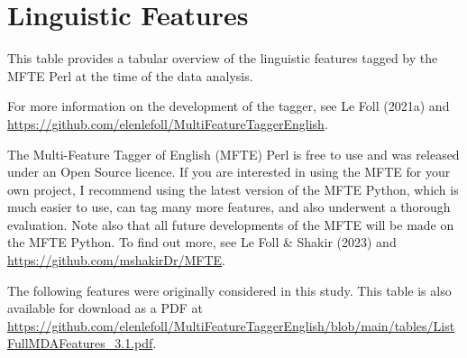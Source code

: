 \documentclass[
  letterpaper,
  DIV=11,
  numbers=noendperiod]{scrreprt}
\begin{document}
\chapter{Linguistic Features}\label{linguistic-features}

This table provides a tabular overview of the linguistic features tagged
by the MFTE Perl at the time of the data analysis.

For more information on the development of the tagger, see Le Foll
(2021a) and
\url{https://github.com/elenlefoll/MultiFeatureTaggerEnglish}.

\begin{tcolorbox}[enhanced jigsaw, colframe=quarto-callout-tip-color-frame, title=\textcolor{quarto-callout-tip-color}{\faLightbulb}\hspace{0.5em}{Using the MFTE}, toptitle=1mm, toprule=.15mm, opacityback=0, colbacktitle=quarto-callout-tip-color!10!white, bottomtitle=1mm, arc=.35mm, opacitybacktitle=0.6, colback=white, rightrule=.15mm, coltitle=black, left=2mm, titlerule=0mm, bottomrule=.15mm, leftrule=.75mm, breakable]

The Multi-Feature Tagger of English (MFTE) Perl is free to use and was
released under an Open Source licence. If you are interested in using
the MFTE for your own project, I recommend using the latest version of
the MFTE Python, which is much easier to use, can tag many more
features, and also underwent a thorough evaluation. Note also that all
future developments of the MFTE will be made on the MFTE Python. To find
out more, see Le Foll \& Shakir (2023) and
\url{https://github.com/mshakirDr/MFTE}.

\end{tcolorbox}

The following features were originally considered in this study. This
table is also available for download as a PDF at
\url{https://github.com/elenlefoll/MultiFeatureTaggerEnglish/blob/main/tables/ListFullMDAFeatures_3.1.pdf}.
\end{document}
